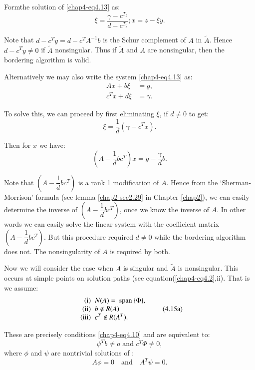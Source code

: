 Form\pageoriginale the solution of \eqref{chap4-eq4.13} as:
\begin{equation*}
\xi = \frac{\gamma -c^{T_z}}{d-c^{T_y}}; x = z-\xi
y. \tag{4.14b}\label{chap4-eq4.14b} 
\end{equation*} 
 
Note that $d - c^Ty = d-c^T A^{-1}b$ is the Schur complement of $A$
 in $\tilde{A}$. Hence $d - c^Ty \neq 0$ if $\tilde{A}$
 nonsingular. Thus if $\tilde{A}$ and $A$ are nonsingular, then the
 bordering algorithm is valid. 
 
Alternatively we may also write the system \eqref{chap4-eq4.13} as:
\begin{align*}
Ax + b \xi &= g,\\
c^T x + d \xi &= \gamma .
\end{align*} 
 
To solve this, we can proceed by first eliminating $\xi$, if $d \neq
0$ to get:  
$$
\xi = \frac{1}{d}(\gamma - c^T x).
$$
 
Then for $x$ we have:
$$
(A - \frac{1}{d}bc^T ) x = g - \frac{\gamma}{d}b. 
$$
  
Note that $(A - \dfrac{1}{d}bc^T )$ is a rank 1 modification of
 $A$. Hence from the `Sherman-Morrison' formula (see lemma
\ref{chap2-sec2.29} in  Chapter \ref{chap2}), we can easily determine
the inverse of 
 $(A-\dfrac{1}{d}bc^T)$, once we know the inverse of $A$. In other
 words we can easily solve the linear system with the coefficient
 matrix $(A-\dfrac{1}{d}bc^T)$. But this procedure required $d \neq 0$
 while the bordering algorithm does not. The nonsingularity of $A$ is
 required by both. 
 
 Now we will consider the case when $A$ is singular and $\tilde{A}$ is
 nonsingular. This occurs at simple points on solution paths (see   
equation\pageoriginale (\ref{chap4-eq4.2},ii). That is we assume:
\begin{equation*}
\begin{array}{r@{\;\;}l}
\text{(i)} &  N(A)= \text{\ span\ } \{ \Phi\},\\
\text{(ii)} & b \notin R(A)\\
\text{(iii)} & c^T \notin R (A^T).
\end{array}\tag{4.15a}\label{chap4-eq4.15a}
\end{equation*}

These are precisely conditions \eqref{chap4-eq4.10} and are equivalent to:
\begin{equation*}
\psi ^T b  \neq o \text{ and } c^T \Phi \neq 0,
\tag{4.15b}\label{chap4-eq4.15b} 
\end{equation*}
where $\phi $ and $\psi$ are nontrivial solutions of :
\begin{equation*}
 A\phi = 0\quad \text{and}\quad A^T \psi =0.\tag
 {4.15c}\label{chap4-eq4.15c}  
\end{equation*}

